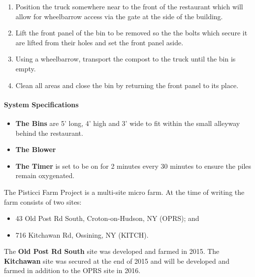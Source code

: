 \begin{enumerate}
\def\labelenumi{\arabic{enumi}.}
\itemsep1pt\parskip0pt
\item
  Position the truck somewhere near to the front of the restaurant which
  will allow for wheelbarrow access via the gate at the side of the
  building.
\item
  Lift the front panel of the bin to be removed so the the bolts which
  secure it are lifted from their holes and set the front panel aside.
\item
  Using a wheelbarrow, transport the compost to the truck until the bin
  is empty.
\item
  Clean all areas and close the bin by returning the front panel to its
  place.
\end{enumerate}

\paragraph{System Specifications}\label{system-specifications}

\begin{itemize}
\itemsep1pt\parskip0pt
\item
  \textbf{The Bins} are 5' long, 4' high and 3' wide to fit within the
  small alleyway behind the restaurant.
\item
  \textbf{The Blower}
\item
  \textbf{The Timer} is set to be on for 2 minutes every 30 minutes to
  ensure the piles remain oxygenated.
\end{itemize}


The Pisticci Farm Project is a multi-site micro farm. At the time of
writing the farm consists of two sites:

\begin{itemize}
\itemsep1pt\parskip0pt
\item
  43 Old Post Rd South, Croton-on-Hudson, NY (OPRS); and
\item
  716 Kitchawan Rd, Ossining, NY (KITCH).
\end{itemize}

The \textbf{Old Post Rd South} site was developed and farmed in 2015.
The \textbf{Kitchawan} site was secured at the end of 2015 and will be
developed and farmed in addition to the OPRS site in 2016.

